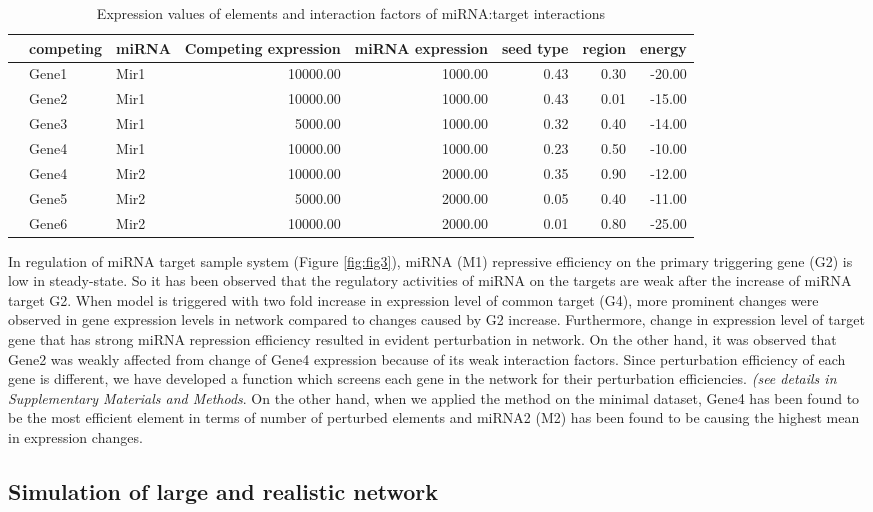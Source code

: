 \documentclass[a4,center,fleqn]{NAR}
\begin{document}
\begin{table}[ht]
\centering
\caption{Expression values of elements and interaction factors of miRNA:target interactions} 
\begin{tabular}{rllrrrrr}
  \hline
 & competing & miRNA & Competing expression & miRNA expression & seed type & region & energy \\ 
  \hline
   & Gene1 & Mir1 & 10000.00 & 1000.00 & 0.43 & 0.30 & -20.00 \\ 
   & Gene2 & Mir1 & 10000.00 & 1000.00 & 0.43 & 0.01 & -15.00 \\ 
   & Gene3 & Mir1 & 5000.00 & 1000.00 & 0.32 & 0.40 & -14.00 \\ 
   & Gene4 & Mir1 & 10000.00 & 1000.00 & 0.23 & 0.50 & -10.00 \\ 
   & Gene4 & Mir2 & 10000.00 & 2000.00 & 0.35 & 0.90 & -12.00 \\ 
   & Gene5 & Mir2 & 5000.00 & 2000.00 & 0.05 & 0.40 & -11.00 \\ 
   & Gene6 & Mir2 & 10000.00 & 2000.00 & 0.01 & 0.80 & -25.00 \\ 
   \hline
\end{tabular}
\label{tab:one}
\end{table}

In regulation of miRNA target sample system (Figure \ref{fig:fig3}),
miRNA (M1) repressive efficiency on the primary triggering gene (G2) is
low in steady-state. So it has been observed that the regulatory
activities of miRNA on the targets are weak after the increase of miRNA
target G2. When model is triggered with two fold increase in expression
level of common target (G4), more prominent changes were observed in
gene expression levels in network compared to changes caused by G2
increase. Furthermore, change in expression level of target gene that
has strong miRNA repression efficiency resulted in evident perturbation
in network. On the other hand, it was observed that Gene2 was weakly
affected from change of Gene4 expression because of its weak interaction
factors. Since perturbation efficiency of each gene is different, we
have developed a function which screens each gene in the network for
their perturbation efficiencies. \emph{(see details in Supplementary
Materials and Methods}. On the other hand, when we applied the method on
the minimal dataset, Gene4 has been found to be the most efficient
element in terms of number of perturbed elements and miRNA2 (M2) has
been found to be causing the highest mean in expression changes.

\subsection{Simulation of large and realistic network}
\end{document}

